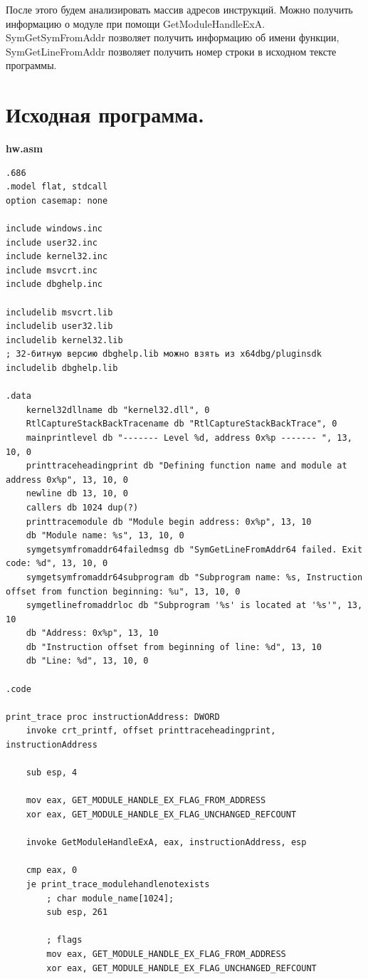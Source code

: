 \documentclass[a4paper,14pt]{extarticle}
\begin{document}
После этого будем анализировать массив адресов инструкций. Можно получить информацию о 
модуле при помощи GetModuleHandleExA. SymGetSymFromAddr позволяет получить
информацию об имени функции, SymGetLineFromAddr позволяет получить номер строки в 
исходном тексте программы.

\section{Исходная программа.}
\textbf{hw.asm}
\begin{verbatim}
.686
.model flat, stdcall
option casemap: none

include windows.inc
include user32.inc
include kernel32.inc
include msvcrt.inc
include dbghelp.inc

includelib msvcrt.lib
includelib user32.lib 
includelib kernel32.lib 
; 32-битную версию dbghelp.lib можно взять из x64dbg/pluginsdk
includelib dbghelp.lib

.data
	kernel32dllname db "kernel32.dll", 0
	RtlCaptureStackBackTracename db "RtlCaptureStackBackTrace", 0
	mainprintlevel db "------- Level %d, address 0x%p ------- ", 13, 10, 0
	printtraceheadingprint db "Defining function name and module at address 0x%p", 13, 10, 0
	newline db 13, 10, 0
	callers db 1024 dup(?)
	printtracemodule db "Module begin address: 0x%p", 13, 10
	db "Module name: %s", 13, 10, 0
	symgetsymfromaddr64failedmsg db "SymGetLineFromAddr64 failed. Exit code: %d", 13, 10, 0
	symgetsymfromaddr64subprogram db "Subprogram name: %s, Instruction offset from function beginning: %u", 13, 10, 0
	symgetlinefromaddrloc db "Subprogram '%s' is located at '%s'", 13, 10
	db "Address: 0x%p", 13, 10
	db "Instruction offset from beginning of line: %d", 13, 10
	db "Line: %d", 13, 10, 0

.code

print_trace proc instructionAddress: DWORD
    invoke crt_printf, offset printtraceheadingprint, instructionAddress

	sub esp, 4

	mov eax, GET_MODULE_HANDLE_EX_FLAG_FROM_ADDRESS
	xor eax, GET_MODULE_HANDLE_EX_FLAG_UNCHANGED_REFCOUNT

	invoke GetModuleHandleExA, eax, instructionAddress, esp

	cmp eax, 0
	je print_trace_modulehandlenotexists
		; char module_name[1024];
		sub esp, 261

		; flags
		mov eax, GET_MODULE_HANDLE_EX_FLAG_FROM_ADDRESS
		xor eax, GET_MODULE_HANDLE_EX_FLAG_UNCHANGED_REFCOUNT
		

\end{verbatim}
\end{document}
